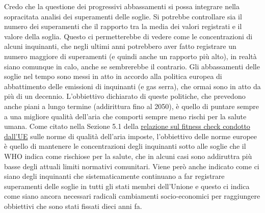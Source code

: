 \documentclass{article}
\begin{document}
Credo che la questione dei progressivi abbassamenti si possa integrare nella sopracitata analisi dei superamenti delle soglie. Si potrebbe controllare sia il numero dei superamenti che il rapporto tra la media dei valori registrati e il valore della soglia. Questo ci permetterebbe di vedere come le concentrazioni di alcuni inquinanti, che negli ultimi anni potrebbero aver fatto registrare un numero maggiore di superamenti (e quindi anche un rapporto più alto), in realtà siano comunque in calo, anche se sembrerebbe il contrario. Gli abbassamenti delle soglie nel tempo sono messi in atto in accordo alla politica europea di abbattimento delle emissioni di inquinanti (e gas serra), che ormai sono in atto da più di un decennio. L'obbiettivo dichiarato di queste politiche, che prevedono anche piani a lungo termine (addirittura fino al 2050), è quello di puntare sempre a una migliore qualità dell'aria che comporti sempre meno rischi per la salute umana.
Come citato nella Sezione 5.1 della \href{https://ec.europa.eu/environment/air/pdf/SWD_2019_427_F1_AAQ\%20Fitness\%20Check.pdf}{relazione sul fitness check condotto dall'UE} sulle norme di qualità dell'aria imposte, l'obbiettivo delle norme europee è quello di mantenere le concentrazioni degli inquinanti sotto alle soglie che il WHO indica come rischiose per la salute, che in alcuni casi sono addiruttra più basse degli attuali limiti normativi comunitari. Viene però anche indicato come ci siano degli inquinanti che sistematicamente continuano a far registrare superamenti delle soglie in tutti gli stati membri dell'Unione e questo ci indica come siano ancora necessari radicali cambiamenti socio-economici per raggiungere obbiettivi che sono stati fissati dieci anni fa.
\end{document}
